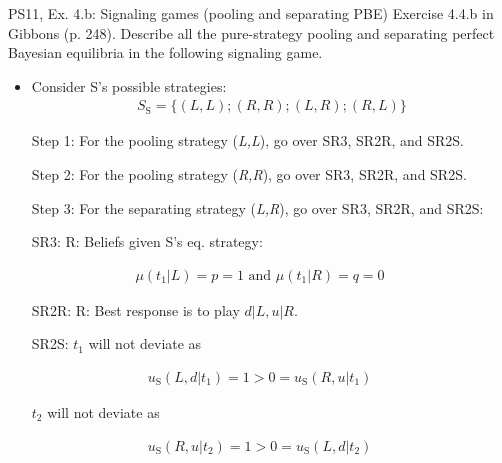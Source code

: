 \begin{frame}{PS11, Ex. 4.b: Signaling games (pooling and separating PBE)}
    Exercise 4.4.b in Gibbons (p. 248). Describe all the pure-strategy pooling and separating perfect Bayesian equilibria in the following signaling game.\vspace{-8pt}
    \begin{multicols}{2}
      \begin{itemize}
        \item Consider S's possible strategies:\vspace{-4pt}\begin{align*}S_\text{S}=\{(L,L);(R,R);(L,R);(R,L)\} \end{align*}\vspace{-16pt}
        \item[Step 1:] For the pooling strategy (\textit{L,L}), go over SR3, SR2R, and SR2S.
        \item[Step 2:] For the pooling strategy (\textit{R,R}), go over SR3, SR2R, and SR2S.
        \item[Step 3:] For the separating strategy (\textit{L,R}), go over SR3, SR2R, and SR2S:
        \item[SR3:] R: Beliefs given S's eq. strategy:
      \end{itemize}\vspace{-10pt}
      \begin{align*}
        \mu(t_1|L)=p=1\text{ and }\mu(t_1|R)=q=0
      \end{align*}\vspace{-18pt}
      \begin{itemize}
        \item[SR2R:] R: Best response is to play $d|L,u|R$.\\
        \item[SR2S:] $t_1$ will not deviate as
      \end{itemize}\vspace{-10pt}
      \begin{align*}
        u_\text{S}(L,d|t_1)=1>0=u_\text{S}(R,u|t_1)
      \end{align*}\vspace{-20pt}
      \begin{itemize}
        \item[] $t_2$ will not deviate as
      \end{itemize}\vspace{-10pt}
      \begin{align*}
        u_\text{S}(R,u|t_2)=1>0=u_\text{S}(L,d|t_2)

\end{align*}
\end{multicols}
\end{frame}
